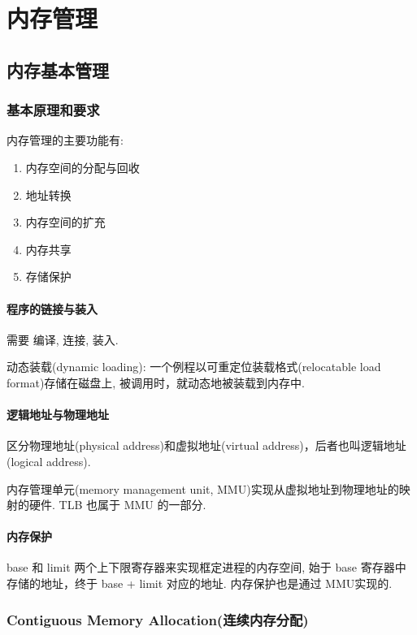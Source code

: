 \section{内存管理}
\subsection{内存基本管理}

\subsubsection{基本原理和要求}
内存管理的主要功能有:
\begin{enumerate}
    \item 内存空间的分配与回收
    \item 地址转换
    \item 内存空间的扩充
    \item 内存共享
    \item 存储保护
\end{enumerate}

\paragraph{程序的链接与装入}需要 编译, 连接, 装入. 

动态装载(dynamic loading): 一个例程以可重定位装载格式(relocatable load format)存储在磁盘上, 被调用时，就动态地被装载到内存中. 

\paragraph{逻辑地址与物理地址}区分物理地址(physical address)和虚拟地址(virtual address)，后者也叫逻辑地址(logical address). 

内存管理单元(memory management unit, MMU)实现从虚拟地址到物理地址的映射的硬件. TLB 也属于 MMU 的一部分. 

\paragraph{内存保护}base 和 limit 两个上下限寄存器来实现框定进程的内存空间, 始于 base 寄存器中存储的地址，终于 base + limit 对应的地址. 内存保护也是通过 MMU实现的. 

\subsubsection{Contiguous Memory Allocation(连续内存分配)}

